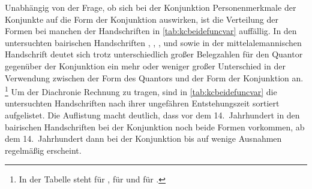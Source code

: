 Unabhängig von der Frage, ob sich bei der Konjunktion 
 Personenmerkmale der Konjunkte auf die Form der
Konjunktion auswirken, ist die Verteilung der Formen bei manchen der
Handschriften in \cref{tab:kcbeidefuncvar} auffällig. In den untersuchten
bairischen Handschriften \citet{kc:A1}, \citet{kc:M}, \citet{kc:B1},
\citet{kc:VB} und \citet{kc:C1} sowie in der mittelalemannischen Handschrift
\citet{kc:K} deutet sich trotz unterschiedlich großer Belegzahlen für den
Quantor gegenüber der Konjunktion ein mehr oder weniger großer Unterschied in
der Verwendung zwischen der Form des Quantors und der Form der Konjunktion an.%
%
	\footnote{In der Tabelle steht \q*{--} für ,
	\q{(\chk)} für  und \q*{\chk} für .}
%
Um der Diachronie Rechnung zu tragen, sind in \cref{tab:kcbeidefuncvar} die
untersuchten Handschriften nach ihrer ungefähren Entstehungszeit sortiert
aufgelistet. Die Auflistung macht deutlich, dass vor dem 14.~Jahrhundert in den
bairischen Handschriften bei der Konjunktion noch beide Formen vorkommen, ab
dem 14.~Jahrhundert dann bei der Konjunktion bis auf wenige Ausnahmen regelmäßig
 erscheint.

